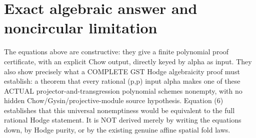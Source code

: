 \documentclass[11pt]{article}
\begin{document}
\section{Exact algebraic answer and noncircular limitation}
The equations above are constructive: they give a finite
polynomial proof certificate, with an explicit Chow output,
directly keyed by alpha as input. They also show precisely
what a COMPLETE GST Hodge algebraicity proof must establish:
a theorem that every rational (p,p) input alpha makes one
of these ACTUAL projector-and-transgression polynomial
schemes nonempty, with no hidden Chow/Gysin/projective-module
source hypothesis. Equation (6) establishes that this
universal nonemptiness would be equivalent to the full
rational Hodge statement. It is NOT derived merely by
writing the equations down, by Hodge purity, or by the
existing genuine affine spatial fold laws.
\end{document}
